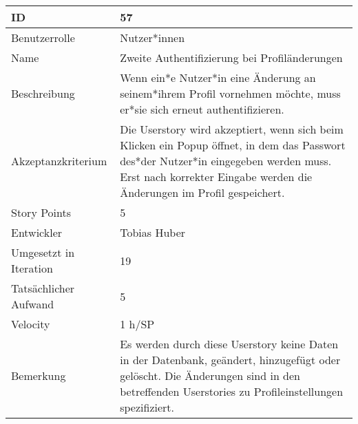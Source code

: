 \begin{tabularx}{\textwidth}{|p{}|X|}
	\hline
	ID & 57\\
	\hline
	Benutzerrolle & Nutzer*innen\\
	\hline
	Name & Zweite Authentifizierung bei Profiländerungen\\
	\hline
	Beschreibung & Wenn ein*e Nutzer*in eine Änderung an seinem*ihrem Profil vornehmen möchte, muss er*sie sich erneut authentifizieren.\\
	\hline
	Akzeptanzkriterium & Die Userstory wird akzeptiert, wenn sich beim Klicken ein Popup öffnet, in dem das Passwort des*der Nutzer*in eingegeben werden muss. Erst nach korrekter Eingabe werden die Änderungen im Profil gespeichert.\\
	\hline
	Story Points & 5\\
	\hline
	Entwickler & Tobias Huber\\
	\hline
	Umgesetzt in Iteration & 19\\
	\hline
	Tatsächlicher Aufwand & 5\\
	\hline
	Velocity & 1 h/SP\\
	\hline
	Bemerkung & Es werden durch diese Userstory keine Daten in der Datenbank, geändert, hinzugefügt oder gelöscht. Die Änderungen sind in den betreffenden Userstories zu Profileinstellungen spezifiziert.\\
	\hline
\end{tabularx}
\vspace{20pt}
